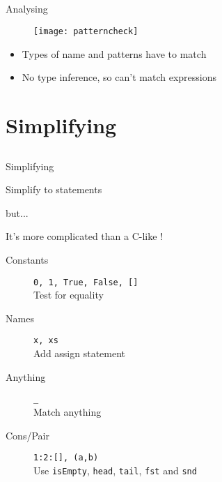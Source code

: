 \subsection*{}

\begin{frame}{Analysing}

  \begin{figure}
    \texttt{[image: patterncheck]}
  \end{figure}

  \begin{itemize}
    \item Types of name and patterns have to match
    \item No type inference, so can't match expressions
  \end{itemize}
\end{frame}

\section{Simplifying}
\subsection*{}

\begin{frame}{Simplifying}

  Simplify to  statements

  but...

  \pause

  It's more complicated than a C-like !

  \begin{description}
    \item[Constants]  \texttt{0, 1, True, False, []} \\
                      Test for equality
    \item[Names]      \texttt{x, xs} \\
                      Add assign statement
    \item[Anything]   \texttt{\_} \\
                      Match anything
    \item[Cons/Pair]  \texttt{1:2:[], (a,b)} \\
                      Use \texttt{isEmpty}, \texttt{head}, \texttt{tail}, \texttt{fst} and \texttt{snd}
  \end{description}

\end{frame}

